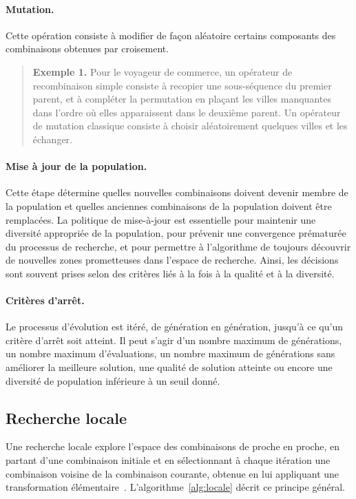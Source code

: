 \documentclass[12pt,a4paper]{book}
\begin{document}
\paragraph{Mutation.}
Cette opération consiste à modifier de façon aléatoire certains composants des combinaisons obtenues par croisement.

\begin{quote}
\textbf{Exemple 1.} Pour le voyageur de commerce, un opérateur de recombinaison simple consiste à recopier une sous-séquence du premier parent, et à compléter la permutation en plaçant les villes manquantes dans l'ordre où elles apparaissent dans le deuxième parent. Un opérateur de mutation classique consiste à choisir aléatoirement quelques villes et les échanger.
\end{quote}

\paragraph{Mise à jour de la population.}
Cette étape détermine quelles nouvelles combinaisons doivent devenir membre de la population et quelles anciennes combinaisons de la population doivent être remplacées. La politique de mise-à-jour est essentielle pour maintenir une diversité appropriée de la population, pour prévenir une convergence prématurée du processus de recherche, et pour permettre à l'algorithme de toujours découvrir de nouvelles zones prometteuses dans l'espace de recherche. Ainsi, les décisions sont souvent prises selon des critères liés à la fois à la qualité et à la diversité.

\paragraph{Critères d'arrêt.}
Le processus d'évolution est itéré, de génération en génération, jusqu'à ce qu'un critère d'arrêt soit atteint. Il peut s'agir d'un nombre maximum de générations, un nombre maximum d'évaluations, un nombre maximum de générations sans améliorer la meilleure solution, une qualité de solution atteinte ou encore une diversité de population inférieure à un seuil donné.

\subsection{Recherche locale}
\label{sec:locale}

Une recherche locale explore l'espace des combinaisons de proche en proche, en partant d'une combinaison initiale et en sélectionnant à chaque itération une combinaison voisine de la combinaison courante, obtenue en lui appliquant une transformation élémentaire~\cite{hoos2005}. L'algorithme~\ref{alg:locale} décrit ce principe général.
\end{document}
